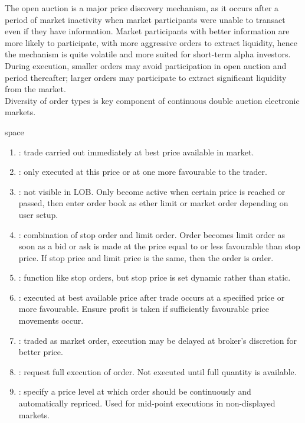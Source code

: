 The open auction is a major price discovery mechanism, as it occurs after a period of market inactivity when market participants were unable to transact even if they have information. Market participants with better information are more likely to participate, with more aggressive orders to extract liquidity, hence the mechanism is quite volatile and more suited for short-term alpha investors.\\
During execution, smaller orders may avoid participation in open auction and period thereafter; larger orders may participate to extract significant liquidity from the market.\\

Diversity of order types is key component of continuous double auction electronic markets.

\begin{definition} {\color{white}space}
\begin{enumerate}[label=\roman*.]
\setlength{\itemsep}{0pt}
\item {}: trade carried out immediately at best price available in market.
\item {}: only executed at this price or at one more favourable to the trader.
\item {}: not visible in LOB. Only become active when certain price is reached or passed, then enter order book as ether limit or market order depending on user setup.
\item {}: combination of stop order and limit order. Order becomes limit order as soon as a bid or ask is made at the price equal to or less favourable than stop price. If stop price and limit price is the same, then the order is  order.
\item {}: function like stop orders, but stop price is set dynamic rather than static.
\item {}: executed at best available price after trade occurs at a specified price or more favourable. Ensure profit is taken if sufficiently favourable price movements occur.
\item {}: traded as market order, execution may be delayed at broker's discretion for better price.
\item {}: request full execution of order. Not executed until full quantity is available.
\item {}: specify a price level at which order should be continuously and automatically repriced. Used for mid-point executions in non-displayed markets.

\end{enumerate}
\end{definition}
